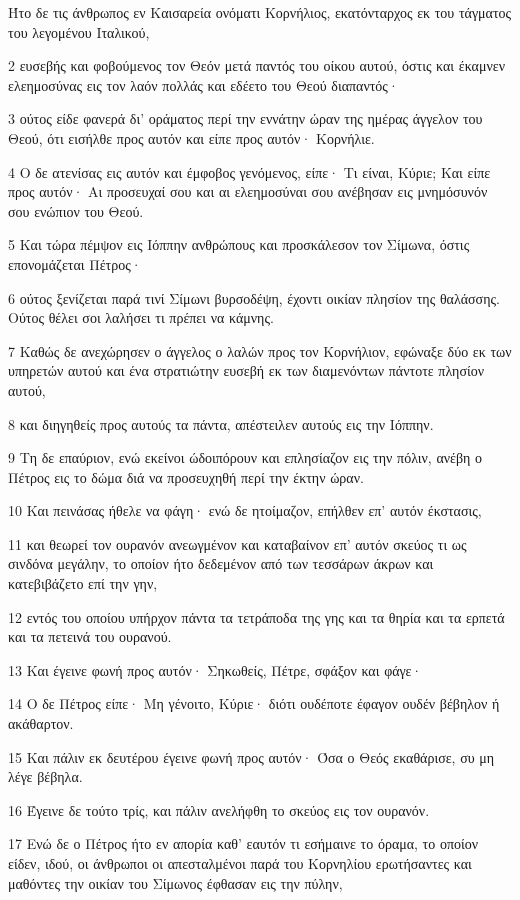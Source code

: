 \par Ήτο δε τις άνθρωπος εν Καισαρεία ονόματι Κορνήλιος, εκατόνταρχος εκ του τάγματος του λεγομένου Ιταλικού,
\par 2 ευσεβής και φοβούμενος τον Θεόν μετά παντός του οίκου αυτού, όστις και έκαμνεν ελεημοσύνας εις τον λαόν πολλάς και εδέετο του Θεού διαπαντός·
\par 3 ούτος είδε φανερά δι' οράματος περί την εννάτην ώραν της ημέρας άγγελον του Θεού, ότι εισήλθε προς αυτόν και είπε προς αυτόν· Κορνήλιε.
\par 4 Ο δε ατενίσας εις αυτόν και έμφοβος γενόμενος, είπε· Τι είναι, Κύριε; Και είπε προς αυτόν· Αι προσευχαί σου και αι ελεημοσύναι σου ανέβησαν εις μνημόσυνόν σου ενώπιον του Θεού.
\par 5 Και τώρα πέμψον εις Ιόππην ανθρώπους και προσκάλεσον τον Σίμωνα, όστις επονομάζεται Πέτρος·
\par 6 ούτος ξενίζεται παρά τινί Σίμωνι βυρσοδέψη, έχοντι οικίαν πλησίον της θαλάσσης. Ούτος θέλει σοι λαλήσει τι πρέπει να κάμνης.
\par 7 Καθώς δε ανεχώρησεν ο άγγελος ο λαλών προς τον Κορνήλιον, εφώναξε δύο εκ των υπηρετών αυτού και ένα στρατιώτην ευσεβή εκ των διαμενόντων πάντοτε πλησίον αυτού,
\par 8 και διηγηθείς προς αυτούς τα πάντα, απέστειλεν αυτούς εις την Ιόππην.
\par 9 Τη δε επαύριον, ενώ εκείνοι ώδοιπόρουν και επλησίαζον εις την πόλιν, ανέβη ο Πέτρος εις το δώμα διά να προσευχηθή περί την έκτην ώραν.
\par 10 Και πεινάσας ήθελε να φάγη· ενώ δε ητοίμαζον, επήλθεν επ' αυτόν έκστασις,
\par 11 και θεωρεί τον ουρανόν ανεωγμένον και καταβαίνον επ' αυτόν σκεύος τι ως σινδόνα μεγάλην, το οποίον ήτο δεδεμένον από των τεσσάρων άκρων και κατεβιβάζετο επί την γην,
\par 12 εντός του οποίου υπήρχον πάντα τα τετράποδα της γης και τα θηρία και τα ερπετά και τα πετεινά του ουρανού.
\par 13 Και έγεινε φωνή προς αυτόν· Σηκωθείς, Πέτρε, σφάξον και φάγε·
\par 14 Ο δε Πέτρος είπε· Μη γένοιτο, Κύριε· διότι ουδέποτε έφαγον ουδέν βέβηλον ή ακάθαρτον.
\par 15 Και πάλιν εκ δευτέρου έγεινε φωνή προς αυτόν· Όσα ο Θεός εκαθάρισε, συ μη λέγε βέβηλα.
\par 16 Έγεινε δε τούτο τρίς, και πάλιν ανελήφθη το σκεύος εις τον ουρανόν.
\par 17 Ενώ δε ο Πέτρος ήτο εν απορία καθ' εαυτόν τι εσήμαινε το όραμα, το οποίον είδεν, ιδού, οι άνθρωποι οι απεσταλμένοι παρά του Κορνηλίου ερωτήσαντες και μαθόντες την οικίαν του Σίμωνος έφθασαν εις την πύλην,
